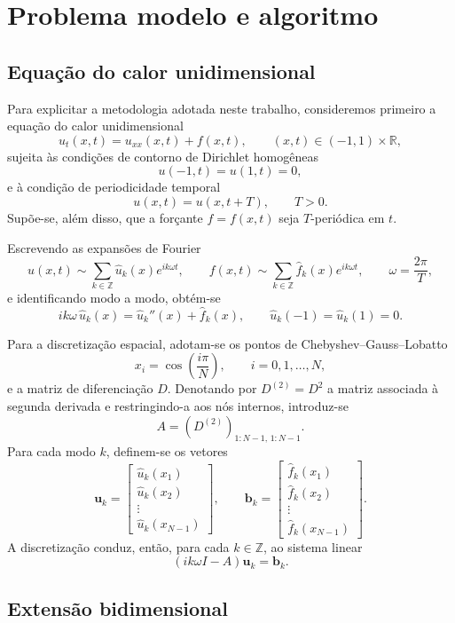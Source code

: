 \section{Problema modelo e algoritmo}

\subsection{Equação do calor unidimensional}

Para explicitar a metodologia adotada neste trabalho, consideremos primeiro a equação do calor unidimensional
\[
u_t(x,t)=u_{xx}(x,t)+f(x,t),
\qquad (x,t)\in (-1,1)\times\mathbb{R},
\]
sujeita às condições de contorno de Dirichlet homogêneas
\[
u(-1,t)=u(1,t)=0,
\]
e à condição de periodicidade temporal
\[
u(x,t)=u(x,t+T),
\qquad T>0.
\]
Supõe-se, além disso, que a forçante \(f=f(x,t)\) seja \(T\)-periódica em \(t\).

Escrevendo as expansões de Fourier
\[
u(x,t)\sim \sum_{k\in\mathbb{Z}}\widehat{u}_k(x)e^{ik\omega t},
\qquad
f(x,t)\sim \sum_{k\in\mathbb{Z}}\widehat{f}_k(x)e^{ik\omega t},
\qquad
\omega=\frac{2\pi}{T},
\]
e identificando modo a modo, obtém-se
\[
ik\omega\,\widehat{u}_k(x)=\widehat{u}_k''(x)+\widehat{f}_k(x),
\qquad
\widehat{u}_k(-1)=\widehat{u}_k(1)=0.
\]

Para a discretização espacial, adotam-se os pontos de Chebyshev--Gauss--Lobatto
\[
x_i=\cos\left(\frac{i\pi}{N}\right),
\qquad i=0,1,\dots,N,
\]
e a matriz de diferenciação \(D\). Denotando por \(D^{(2)}=D^2\) a matriz associada à segunda derivada e restringindo-a aos nós internos, introduz-se
\[
A=\left(D^{(2)}\right)_{1:N-1,\,1:N-1}.
\]
Para cada modo \(k\), definem-se os vetores
\[
\mathbf{u}_k=
\begin{bmatrix}
\widehat{u}_k(x_1)\\
\widehat{u}_k(x_2)\\
\vdots\\
\widehat{u}_k(x_{N-1})
\end{bmatrix},
\qquad
\mathbf{b}_k=
\begin{bmatrix}
\widehat{f}_k(x_1)\\
\widehat{f}_k(x_2)\\
\vdots\\
\widehat{f}_k(x_{N-1})
\end{bmatrix}.
\]
A discretização conduz, então, para cada \(k\in\mathbb{Z}\), ao sistema linear
\[
\left(ik\omega I-A\right)\mathbf{u}_k=\mathbf{b}_k.
\]

\subsection{Extensão bidimensional}

